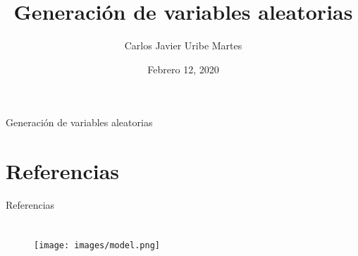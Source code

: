 \documentclass[aspectratio=43, xcolor=table]{beamer}
\title{Generación de variables aleatorias} %
\author[C.J. Uribe-Martes]{Carlos Javier Uribe Martes}
\institute[CUC]{
    Ingeniería Industrial%
    \\%
    Universidad de la Costa%
} %
\date{Febrero 12, 2020}
\begin{document}
    
    \frame{\titlepage}
    
    
    
    \begin{frame}{Generación de variables aleatorias}
        \tableofcontents
    \end{frame}
    
    
    
    
    
    
    
    
    
    
    \nocite{dunna}
    \nocite{BCN}
    \nocite{PSD}
    \nocite{ross}
    \section*{Referencias} %
        \begin{frame}{Referencias}
            \printbibliography
        \end{frame}
     
    \section{}   
        \begin{frame}{}
            \begin{figure}
                \centering
                \texttt{[image: images/model.png]}
            \end{figure}
        \end{frame}
\end{document}
